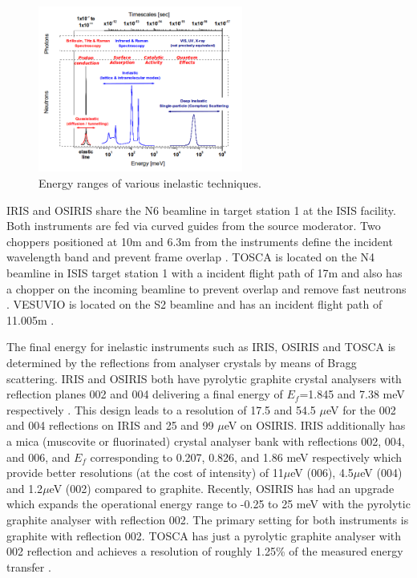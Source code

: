 \documentclass[paper=a4, fontsize=11pt]{scrartcl}	%
\numberwithin{equation}{section}															%
\numberwithin{figure}{section}																%
\numberwithin{table}{section}																%
\begin{document}
\begin{figure}[H]
\centering
\includegraphics[width=0.6\textwidth]{img/instrument-energy-chart.png}
\caption{Energy ranges of various inelastic techniques.}
\label{fig:instrument-energy-range}
\end{figure}

IRIS and OSIRIS share the N6 beamline in target station 1 at the ISIS facility. Both instruments are fed via curved guides from the source moderator. Two choppers positioned at 10m and 6.3m from the instruments define the incident wavelength band and prevent frame overlap \cite{smukhopadhyay2014}. TOSCA is located on the N4 beamline in ISIS target station 1 with a incident flight path of 17m and also has a chopper on the incoming beamline to prevent overlap and remove fast neutrons \cite{colognesi2002tosca}. VESUVIO is located on the S2 beamline and has an incident flight path of 11.005m \cite{mayers2011calibration}.

The final energy for inelastic instruments such as IRIS, OSIRIS and TOSCA is determined by the reflections from analyser crystals by means of Bragg scattering. IRIS and OSIRIS both have pyrolytic graphite crystal analysers with reflection planes 002 and 004 delivering a final energy of $E_f$=1.845 and 7.38 meV respectively \cite{adams2001iris}\cite{telling2008osiris}. This design leads to a resolution of 17.5 and 54.5 $\mu$eV for the 002 and 004 reflections on IRIS and 25 and 99 $\mu$eV on OSIRIS. IRIS additionally has a mica (muscovite or fluorinated) crystal analyser bank with reflections 002, 004, and 006, and $E_f$ corresponding to 0.207, 0.826, and 1.86 meV respectively which provide better resolutions (at the cost of intensity) of 11$\mu$eV (006), 4.5$\mu$eV (004) and
1.2$\mu$eV (002) compared to graphite. Recently, OSIRIS has had an upgrade which expands the operational energy range to -0.25 to 25 meV with the pyrolytic graphite analyser with reflection 002. The primary setting for both instruments is graphite with reflection 002. TOSCA has just a pyrolytic graphite analyser with 002 reflection \cite{colognesi2002tosca} and achieves a resolution of roughly 1.25\% of the measured energy transfer \cite{parker2003tosca}.
\end{document}
